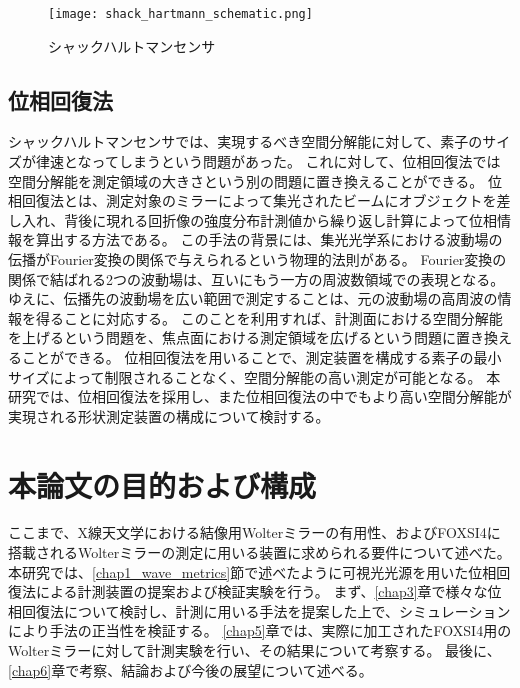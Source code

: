 \begin{figure}[h]
\centering
\texttt{[image: shack\_hartmann\_schematic.png]}
\caption{シャックハルトマンセンサ}
\label{fig:shack_hartmann_schematic}
\end{figure}

\subsection{位相回復法}
シャックハルトマンセンサでは、実現するべき空間分解能に対して、素子のサイズが律速となってしまうという問題があった。
これに対して、位相回復法では空間分解能を測定領域の大きさという別の問題に置き換えることができる。
位相回復法とは、測定対象のミラーによって集光されたビームにオブジェクトを差し入れ、背後に現れる回折像の強度分布計測値から繰り返し計算によって位相情報を算出する方法である。
この手法の背景には、集光光学系における波動場の伝播がFourier変換の関係で与えられるという物理的法則がある。
Fourier変換の関係で結ばれる2つの波動場は、互いにもう一方の周波数領域での表現となる。
ゆえに、伝播先の波動場を広い範囲で測定することは、元の波動場の高周波の情報を得ることに対応する。
このことを利用すれば、計測面における空間分解能を上げるという問題を、焦点面における測定領域を広げるという問題に置き換えることができる。
位相回復法を用いることで、測定装置を構成する素子の最小サイズによって制限されることなく、空間分解能の高い測定が可能となる。
本研究では、位相回復法を採用し、また位相回復法の中でもより高い空間分解能が実現される形状測定装置の構成について検討する。

\clearpage
\newpage

\section{本論文の目的および構成}
\label{chap1_purpose}

ここまで、X線天文学における結像用Wolterミラーの有用性、およびFOXSI4に搭載されるWolterミラーの測定に用いる装置に求められる要件について述べた。
本研究では、\ref{chap1_wave_metrics}節で述べたように可視光光源を用いた位相回復法による計測装置の提案および検証実験を行う。
まず、\ref{chap3}章で様々な位相回復法について検討し、計測に用いる手法を提案した上で、シミュレーションにより手法の正当性を検証する。
\ref{chap5}章では、実際に加工されたFOXSI4用のWolterミラーに対して計測実験を行い、その結果について考察する。
最後に、\ref{chap6}章で考察、結論および今後の展望について述べる。


